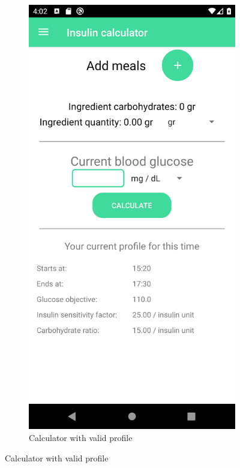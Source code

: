 \begin{figure}[H]
\begin{center}
\begin{subfigure}{.3\textwidth}
            \includegraphics[scale=0.1, width=\textwidth]{_figures/calc_with_profile.png}
            \caption{Calculator with valid profile} 
        \end{subfigure}

\end{center}
\end{figure}
